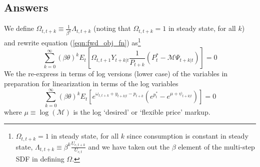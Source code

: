 \documentclass[authoryear,11pt]{elsarticle}
\begin{document}
\subsection*{Answers}
We define $\Omega_{t,t+k}\equiv \frac{1}{\beta^{k}} \Lambda_{t,t+k}$ (noting that $\Omega_{t,t+k}=1$ in steady state, for all $k$) and rewrite equation (\ref{eqn:fwd_obj_fn}) as\footnote{$\Omega_{t,t+k}=1$ in steady state, for all $k$ since consumption is constant in steady state, $\Lambda_{t,t+k}\equiv \beta^{k} \frac{U_{c,t+k}}{U_{c,t}}$ and we have taken out the $\beta$ element of the multi-step SDF in defining $\Omega$.}
\[
\sum\limits_{k=0}^{\infty} (\beta \theta)^{k} E_{t} \left[ \Omega_{t,t+1} Y_{t+k|t} \frac{1}{P_{t+k}} \left( P_{t}^{\ast} - \mathcal{M}\Psi_{t+k|t} \right) \right] = 0
\]
We the re-express in terms of log versions (lower case) of the variables in preparation for linearization in terms of the log variables
\[
\sum\limits_{k=0}^{\infty} (\beta \theta)^{k} E_{t} \left[ e^{\omega_{t,t+k} + y_{t+k|t} - p_{t+k}} \left( e^{p_{t}^{\ast}} - e^{\mu + \psi_{t+k|t}} \right) \right] = 0
\]
where $\mu \equiv \log{(\mathcal{M})}$ is the log `desired' or `flexible price' markup.
\end{document}
